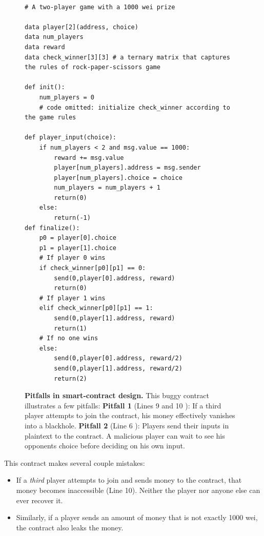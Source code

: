 \documentclass[10pt,twocolumn,letterpaper]{article}
\newcommand{\elaine}[1]{}
\begin{document}
\begin{figure}
\begin{mdframed}
\begin{verbatim}

# A two-player game with a 1000 wei prize

data player[2](address, choice)
data num_players
data reward
data check_winner[3][3] # a ternary matrix that captures the rules of rock-paper-scissors game

def init():
	num_players = 0
	# code omitted: initialize check_winner according to the game rules
	
def player_input(choice):
	if num_players < 2 and msg.value == 1000:
		reward += msg.value
		player[num_players].address = msg.sender
		player[num_players].choice = choice
		num_players = num_players + 1
		return(0)
	else:
		return(-1)
def finalize():
	p0 = player[0].choice
	p1 = player[1].choice
	# If player 0 wins
	if check_winner[p0][p1] == 0:
		send(0,player[0].address, reward)
		return(0)
	# If player 1 wins
	elif check_winner[p0][p1] == 1:
		send(0,player[1].address, reward)
		return(1)
	# If no one wins
	else:
		send(0,player[0].address, reward/2)
		send(0,player[1].address, reward/2)
		return(2)
\end{verbatim}
\end{mdframed}
\caption{
\label{fig:moneyleaks}
{\bf Pitfalls in smart-contract design.} This buggy contract illustrates a few pitfalls: \newline
{\bf Pitfall 1} (Lines 9 and 10 \elaine{hard coded}): If a third player
attempts to join the contract, his
money effectively vanishes into a blackhole. \newline
{\bf Pitfall 2} (Line 6 \elaine{hard coded}): Players send their inputs 
in plaintext to the contract. A malicious player 
can wait to see his opponents choice before deciding on his own input.
}
\end{figure}


This contract makes several couple mistakes:
\begin{itemize}[leftmargin=5mm]
\item
If a \emph{third} player attempts to join and sends money to the contract,
that money becomes inaccessible (Line 10). Neither the player nor anyone else can ever recover it.
\item
Similarly, if a player sends an amount of money that is not
exactly 1000 wei,
the contract also leaks the money.
\end{itemize}
\end{document}

